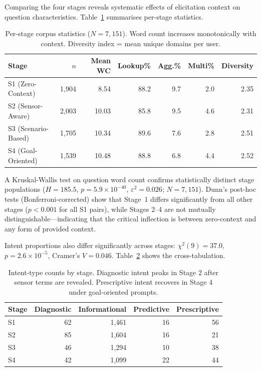 \documentclass[acmsmall]{acmart}
\begin{document}
Comparing the four stages reveals systematic effects of elicitation context on question characteristics. Table~\ref{tab:stage-stats} summarises per-stage statistics.

\begin{table}[t]
\centering
\caption{Per-stage corpus statistics ($N=7{,}151$). Word count increases monotonically with context. Diversity index = mean unique domains per user.}
\label{tab:stage-stats}
\small
\begin{tabular}{@{}lrrrrrr@{}}
\toprule
\textbf{Stage} & \textbf{$n$} & \textbf{Mean WC} & \textbf{Lookup\%} & \textbf{Agg.\%} & \textbf{Multi\%} & \textbf{Diversity} \\
\midrule
S1 (Zero-Context)   & 1{,}904 & 8.54 & 88.2 &  9.7 & 2.0 & 2.35 \\
S2 (Sensor-Aware)   & 2{,}003 & 10.03 & 85.8 &  9.5 & 4.6 & 2.31 \\
S3 (Scenario-Based) & 1{,}705 & 10.34 & 89.6 &  7.6 & 2.8 & 2.51 \\
S4 (Goal-Oriented)  & 1{,}539 & 10.48 & 88.8 &  6.8 & 4.4 & 2.52 \\
\bottomrule
\end{tabular}
\end{table}

A Kruskal-Wallis test on question word count confirms statistically distinct stage populations ($H=185.5$, $p=5.9 \times 10^{-40}$, $\varepsilon^2 = 0.026$; $N=7{,}151$). Dunn's post-hoc tests (Bonferroni-corrected) show that Stage~1 differs significantly from all other stages ($p < 0.001$ for all S1 pairs), while Stages 2--4 are not mutually distinguishable---indicating that the critical inflection is between zero-context and any form of provided context.

Intent proportions also differ significantly across stages: $\chi^2(9)=37.0$, $p=2.6 \times 10^{-5}$, Cramer's $V=0.046$. Table~\ref{tab:intent-by-stage} shows the cross-tabulation.

\begin{table}[t]
\centering
\caption{Intent-type counts by stage. Diagnostic intent peaks in Stage 2 after sensor terms are revealed. Prescriptive intent recovers in Stage 4 under goal-oriented prompts.}
\label{tab:intent-by-stage}
\small
\begin{tabular}{@{}lrrrr@{}}
\toprule
\textbf{Stage} & \textbf{Diagnostic} & \textbf{Informational} & \textbf{Predictive} & \textbf{Prescriptive} \\
\midrule
S1 & 62  & 1{,}461 & 16 & 56 \\
S2 & 85  & 1{,}604 & 16 & 21 \\
S3 & 46  & 1{,}294 & 10 & 38 \\
S4 & 42  & 1{,}099 & 22 & 44 \\
\bottomrule
\end{tabular}
\end{table}
\end{document}
